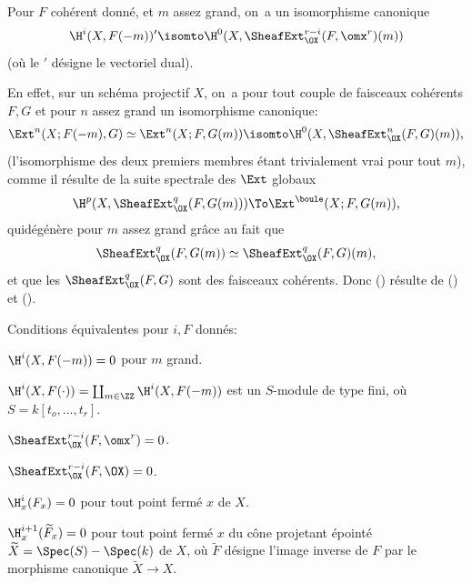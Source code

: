 \begin{corollaire} \label{XII.1.2} Pour $F$ coh\'erent donn\'e, et $m$ assez grand, on~a un isomorphisme canonique
\steco
\begin{equation} \label{eq:XII.5} {}\H^i(X, F(-m))'\isomto\H^0(X, \SheafExt_{\OX}^{r-i}(F, \omx^r)(m))
\end{equation}
(o\`u le $'$ d\'esigne le vectoriel dual).
\end{corollaire}
En effet, sur un sch\'ema projectif $X$, on~a pour tout couple de faisceaux coh\'erents $F, G$ et pour $n$ assez grand un isomorphisme canonique:
\steco
\begin{equation} \label{eq:XII.6} {}\Ext^n(X;F(-m), G)\simeq \Ext^n(X;F, G(m)) \isomto \H^0(X, \SheafExt_{\OX}^{n}(F, G)(m)),
\end{equation}
(l'isomorphisme des deux premiers membres \'etant trivialement vrai pour tout $m$), comme il r\'esulte de la suite spectrale des $\Ext$ globaux
\[
\H^p(X, \SheafExt^q_{\OX}(F, G(m))) \To \Ext^{\boule}(X;F, G(m)),
\]
qui\pageoriginale d\'eg\'en\`ere pour $m$ assez grand gr\^ace au fait que
\[
\SheafExt^q_{\OX}(F, G(m)) \simeq \SheafExt^q_{\OX}(F, G)(m),
\]
et que les $\SheafExt^q_{\OX}(F, G)$ sont des faisceaux coh\'erents. Donc () r\'esulte de () et ().

\begin{corollaire} \label{XII.1.3}
Conditions \'equivalentes pour $i, F$ donn\'es:
\begin{enumeratei}
\item
$\H^i(X, F(-m))=0$ pour $m$ grand.
\item[\textup{(i bis)}] $\H^i(X, F(\cdot))= \coprod_{m\in\ZZ}\H^i(X, F(-m))$ est un $S$-module de type fini, o\`u $S=k[t_o, \ldots, t_r]$.
\item
$\SheafExt^{r-i}_{\OX}(F, \omx^r)=0$.
\item[\textup{(ii bis)}] $\SheafExt^{r-i}_{\OX}(F, \OX)=0$.
\item
$\H^i_x(F_x)=0$ pour tout point ferm\'e $x$ de $X$.
\item
$\H^{i+1}_x(\widetilde{F}_x)=0$ pour tout point ferm\'e $x$ du c\^{o}ne projetant \'epoint\'e $\widetilde{X}=\Spec(S)-\Spec(k)$ de $X$, o\`u $\widetilde{F}$ d\'esigne l'image inverse de $F$ par le morphisme canonique $\widetilde{X}\to X$.
\end{enumeratei}
\end{corollaire}

